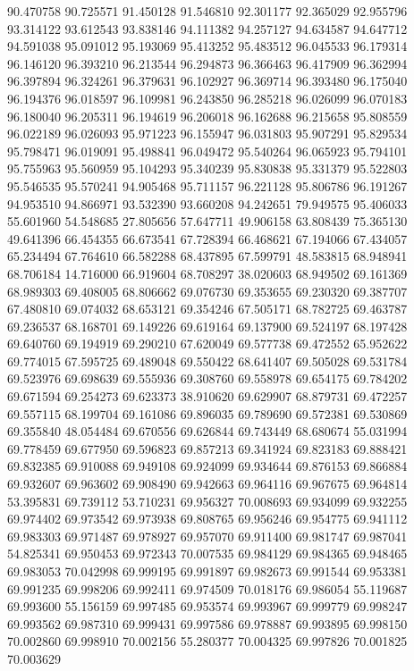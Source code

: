 90.470758
90.725571
91.450128
91.546810
92.301177
92.365029
92.955796
93.314122
93.612543
93.838146
94.111382
94.257127
94.634587
94.647712
94.591038
95.091012
95.193069
95.413252
95.483512
96.045533
96.179314
96.146120
96.393210
96.213544
96.294873
96.366463
96.417909
96.362994
96.397894
96.324261
96.379631
96.102927
96.369714
96.393480
96.175040
96.194376
96.018597
96.109981
96.243850
96.285218
96.026099
96.070183
96.180040
96.205311
96.194619
96.206018
96.162688
96.215658
95.808559
96.022189
96.026093
95.971223
96.155947
96.031803
95.907291
95.829534
95.798471
96.019091
95.498841
96.049472
95.540264
96.065923
95.794101
95.755963
95.560959
95.104293
95.340239
95.830838
95.331379
95.522803
95.546535
95.570241
94.905468
95.711157
96.221128
95.806786
96.191267
94.953510
94.866971
93.532390
93.660208
94.242651
79.949575
95.406033
55.601960
54.548685
27.805656
57.647711
49.906158
63.808439
75.365130
49.641396
66.454355
66.673541
67.728394
66.468621
67.194066
67.434057
65.234494
67.764610
66.582288
68.437895
67.599791
48.583815
68.948941
68.706184
14.716000
66.919604
68.708297
38.020603
68.949502
69.161369
68.989303
69.408005
68.806662
69.076730
69.353655
69.230320
69.387707
67.480810
69.074032
68.653121
69.354246
67.505171
68.782725
69.463787
69.236537
68.168701
69.149226
69.619164
69.137900
69.524197
68.197428
69.640760
69.194919
69.290210
67.620049
69.577738
69.472552
65.952622
69.774015
67.595725
69.489048
69.550422
68.641407
69.505028
69.531784
69.523976
69.698639
69.555936
69.308760
69.558978
69.654175
69.784202
69.671594
69.254273
69.623373
38.910620
69.629907
68.879731
69.472257
69.557115
68.199704
69.161086
69.896035
69.789690
69.572381
69.530869
69.355840
48.054484
69.670556
69.626844
69.743449
68.680674
55.031994
69.778459
69.677950
69.596823
69.857213
69.341924
69.823183
69.888421
69.832385
69.910088
69.949108
69.924099
69.934644
69.876153
69.866884
69.932607
69.963602
69.908490
69.942663
69.964116
69.967675
69.964814
53.395831
69.739112
53.710231
69.956327
70.008693
69.934099
69.932255
69.974402
69.973542
69.973938
69.808765
69.956246
69.954775
69.941112
69.983303
69.971487
69.978927
69.957070
69.911400
69.981747
69.987041
54.825341
69.950453
69.972343
70.007535
69.984129
69.984365
69.948465
69.983053
70.042998
69.999195
69.991897
69.982673
69.991544
69.953381
69.991235
69.998206
69.992411
69.974509
70.018176
69.986054
55.119687
69.993600
55.156159
69.997485
69.953574
69.993967
69.999779
69.998247
69.993562
69.987310
69.999431
69.997586
69.978887
69.993895
69.998150
70.002860
69.998910
70.002156
55.280377
70.004325
69.997826
70.001825
70.003629
